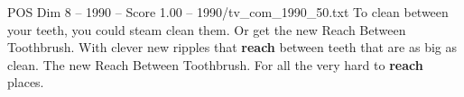 \begin{textsample}{POS Dim 8 – 1990 – Score 1.00 – 1990/tv\_com\_1990\_50.txt}  \label{ex:f8_pos_079}
To clean between your teeth, you could steam clean them.
Or get the new Reach Between Toothbrush.
With clever new ripples that \textbf{reach} between teeth that are as big as clean.
The new Reach Between Toothbrush.
For all the very hard to \textbf{reach} places.

\end{textsample}
